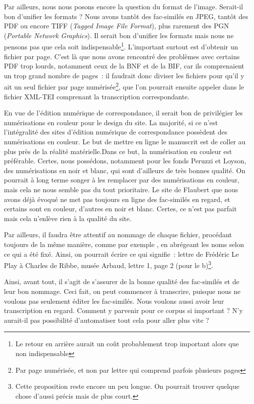 Par ailleurs, nous nous posons encore la question du format de l'image. Serait-il bon d'unifier les formats ? Nous avons tantôt des fac-similés en JPEG, tantôt des PDF ou encore TIFF (\emph{Tagged Image File Format}), plus rarement des PGN (\emph{Portable Network Graphics}). Il serait bon d'unifier les formats mais nous ne pensons pas que cela soit indispensable\footnote{Le retour en arrière aurait un coût probablement trop important alors que non indispensable}. L'important surtout est d'obtenir un fichier par page. C'est là que nous avons rencontré des problèmes avec certains PDF trop lourds, notamment ceux de la BNF et de la BIF, car ils comprenaient un trop grand nombre de pages~: il faudrait donc diviser les fichiers pour qu'il y ait un seul fichier par page numérisée\footnote{Par page numérisée, et non par lettre qui comprend parfois plusieurs pages}, que l'on pourrait ensuite appeler dans le fichier XML-TEI comprenant la transcription correspondante.

En vue de l’édition numérique de correspondance, il serait bon de privilégier les numérisations en couleur pour le design du site. La majorité, si ce n’est l’intégralité des sites d’édition numérique de correspondance possèdent des numérisations en couleur. Le but de mettre en ligne le manuscrit est de coller au plus près de la réalité matérielle.Dans ce but, la numérisation en couleur est préférable. Certes, nous possédons, notamment pour les fonds Peruzzi et Loyson, des numérisations en noir et blanc, qui sont d’ailleurs de très bonnes qualité. On pourrait à long terme songer à les remplacer par des numérisations en couleur, mais cela ne nous semble pas du tout prioritaire. Le site de Flaubert que nous avons déjà évoqué ne met pas toujours en ligne des fac-similés en regard, et certains sont en couleur, d'autres en noir et blanc. Certes, ce n'est pas parfait mais cela n'enlève rien à la qualité du site.

Par ailleurs, il faudra être attentif au nommage de chaque fichier, procédant toujours de la même manière, comme par exemple , en abrégeant les noms selon ce qui a été fixé. Ainsi, on pourrait écrire  ce qui signifie~: lettre de Frédéric Le Play à Charles de Ribbe, musée Arbaud, lettre 1, page 2 (pour le b)\footnote{Cette proposition reste encore un peu longue. On pourrait trouver quelque chose d'aussi précis mais de plus court.}.


Ainsi, avant tout, il s'agit de s'assurer de la bonne qualité des fac-similés et de leur bon nommage.
Ceci fait, on peut commencer à transcrire, puisque nous ne voulons pas seulement éditer les fac-similés. Nous voulons aussi avoir leur transcription en regard. Comment y parvenir pour ce corpus si important ? N'y aurait-il pas possibilité d'automatiser tout cela pour aller plus vite ?

